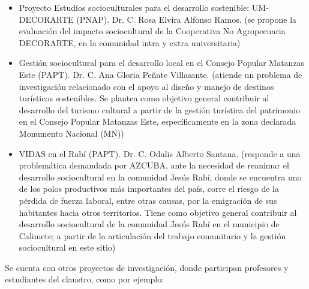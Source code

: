 \begin{itemize}
	\setlength\itemsep{-0.5em}
	\item Proyecto Estudios socioculturales para el desarrollo sostenible: UM-DECORARTE (PNAP). Dr. C. Rosa Elvira Alfonso Ramos. (se propone la evaluación del impacto sociocultural de la Cooperativa No Agropecuaria DECORARTE, en la comunidad intra y extra universitaria)
	\item Gestión sociocultural para el desarrollo local en el Consejo Popular Matanzas Este (PAPT). Dr. C. Ana Gloria Peñate Villasante. (atiende un problema de investigación relacionado con el apoyo al diseño y manejo de destinos turísticos sostenibles. Se plantea como objetivo general contribuir al desarrollo del turismo cultural a partir de la gestión turística del patrimonio en el Consejo Popular Matanzas Este, específicamente en la zona declarada Monumento Nacional (MN))
	\item VIDAS en el Rabí (PAPT). Dr. C. Odalis Alberto Santana. (responde a una problemática demandada por AZCUBA, ante la necesidad de reanimar el desarrollo sociocultural en la comunidad Jesús Rabí, donde se encuentra uno de los polos productivos más importantes del país, corre el riesgo de la pérdida de fuerza laboral, entre otras causas, por la emigración de sus habitantes hacia otros territorios. Tiene como objetivo general contribuir al desarrollo sociocultural de la comunidad Jesús Rabí en el municipio de Calimete; a partir de la articulación del trabajo comunitario y la gestión sociocultural en este sitio)
	
\end{itemize}

Se cuenta con otros proyectos de investigación, donde participan profesores y estudiantes del claustro, como por ejemplo:


